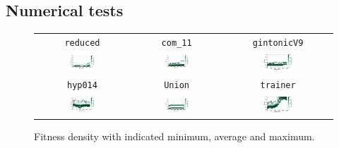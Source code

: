 \documentclass[11pt,a4paper]{scrartcl}
\begin{document}
\subsection{Numerical tests}

\begin{figure}[H]
\center
\begin{tabular}{ccc}
\texttt{reduced} & \texttt{com\_11} & \texttt{gintonicV9} \\
\includegraphics[width=0.3\textwidth]{img/self_adapt_2_reduced.png} &
\includegraphics[width=0.3\textwidth]{img/self_adapt_2_com_11.png} &
\includegraphics[width=0.3\textwidth]{img/self_adapt_2_gintonicV9.png} \\
\texttt{hyp014} & \texttt{Union} & \texttt{trainer} \\
\includegraphics[width=0.3\textwidth]{img/self_adapt_2_hyp014.png} &
\includegraphics[width=0.3\textwidth]{img/self_adapt_2_Union.png} &
\includegraphics[width=0.3\textwidth]{img/self_adapt_2_trainer.png}
\end{tabular}
\caption{Fitness density with indicated minimum, average and maximum.}
\label{fig:self_adapt_2}
\end{figure}
\end{document}
